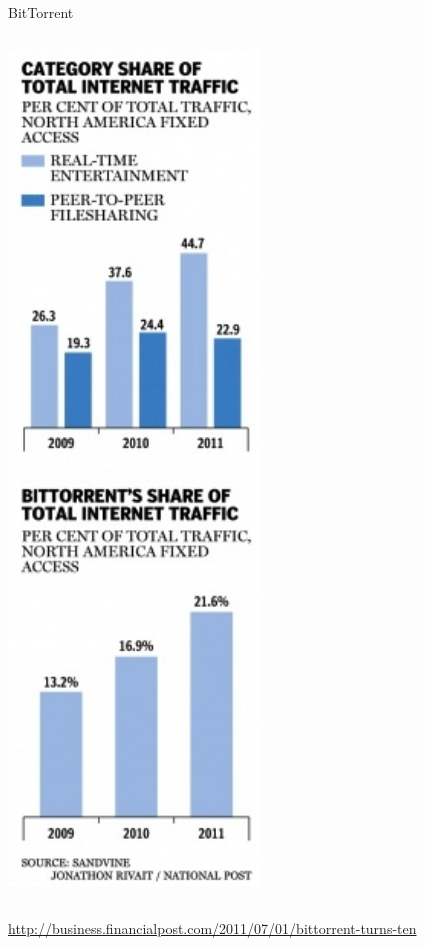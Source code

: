 \begin{frame}{BitTorrent}
\begin{columns}
\begin{column}{0.3\textwidth}
	\includegraphics[width=0.5\textwidth]{figs/10/p2p-stats2.jpg}\\
\end{column}
\end{columns}
\begin{flushright}
	{\tiny \url{http://business.financialpost.com/2011/07/01/bittorrent-turns-ten}}
\end{flushright}
\end{frame}

